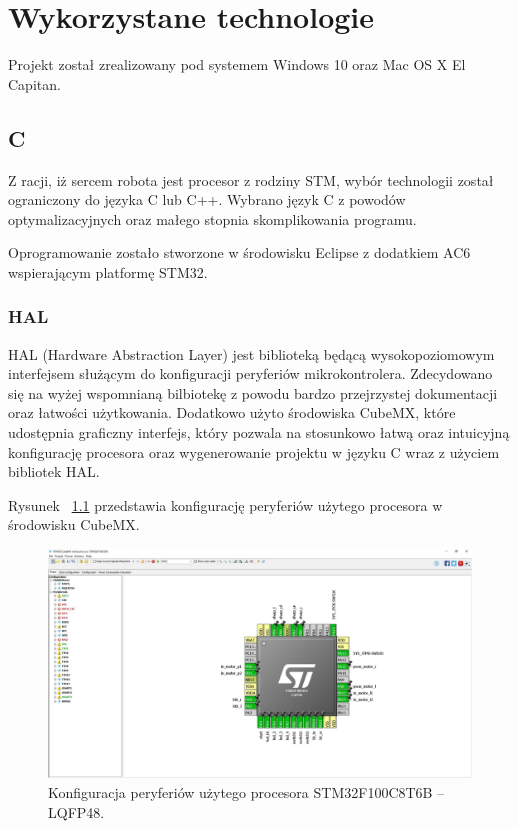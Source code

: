 \chapter{Wykorzystane technologie}

Projekt został zrealizowany pod systemem Windows 10 oraz Mac OS X El Capitan. 

\section{C}
Z racji, iż sercem robota jest procesor z rodziny STM, wybór technologii został ograniczony do języka C lub C++. Wybrano język C z powodów optymalizacyjnych oraz małego stopnia skomplikowania programu. 


Oprogramowanie zostało stworzone w środowisku Eclipse z dodatkiem AC6 wspierającym platformę STM32.

\subsection{HAL}
HAL (Hardware Abstraction Layer) jest biblioteką będącą wysokopoziomowym interfejsem służącym do konfiguracji peryferiów mikrokontrolera. Zdecydowano się na wyżej wspomnianą bilbiotekę z powodu bardzo przejrzystej dokumentacji oraz łatwości użytkowania. Dodatkowo użyto środowiska CubeMX, które udostępnia graficzny interfejs, który pozwala na stosunkowo łatwą oraz intuicyjną konfigurację procesora oraz wygenerowanie projektu w języku C wraz z użyciem bibliotek HAL.


Rysunek ~\ref{fig:cubemx} przedstawia konfigurację peryferiów użytego procesora w środowisku CubeMX.   

\begin{figure}[H]
	\centering
		\includegraphics[width=0.75\linewidth]{pic02/cubemx.jpg}
	\caption{Konfiguracja peryferiów użytego procesora STM32F100C8T6B – LQFP48.}
	\label{fig:cubemx}	
\end{figure}

